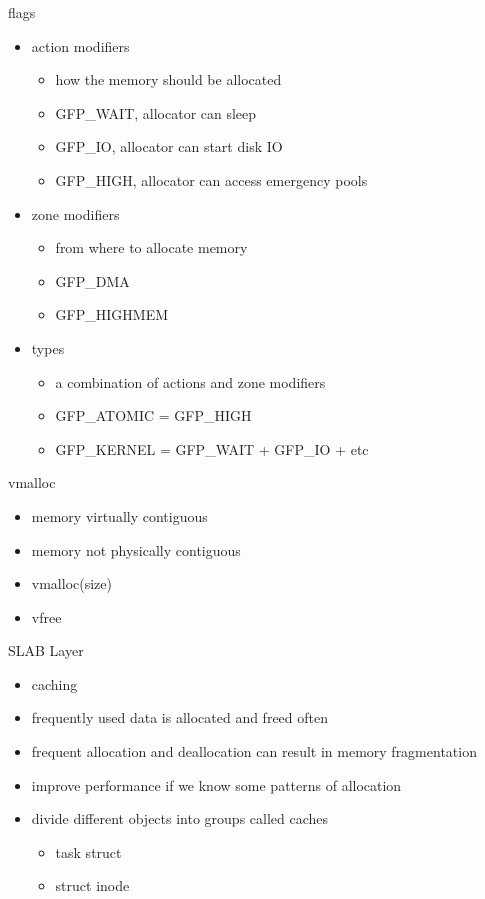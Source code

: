 \documentclass{workshop}
\begin{document}
\begin{frame}{flags}
\begin{itemize}
\item action modifiers
\begin{itemize}
\item how the memory should be allocated
\item GFP_WAIT, allocator can sleep
\item GFP_IO, allocator can start disk IO
\item GFP_HIGH, allocator can access emergency pools
\end{itemize}
\item zone modifiers
\begin{itemize}
\item from where to allocate memory
\item GFP_DMA
\item GFP_HIGHMEM
\end{itemize}
\item types
\begin{itemize}
\item a combination of actions and zone modifiers 
\item GFP_ATOMIC = GFP_HIGH
\item GFP_KERNEL = GFP_WAIT + GFP_IO + etc
\end{itemize}
\end{itemize}
\end{frame}
\begin{frame}{vmalloc}
  \begin{itemize}
  \item memory virtually contiguous
  \item memory not physically contiguous
   \item vmalloc(size)
  \item vfree
  \end{itemize}
\end{frame}

\begin{frame}{SLAB Layer}
  \begin{itemize}
    \item caching
    \item frequently used data is allocated and freed often
    \item frequent allocation and deallocation can result in memory fragmentation
    \item improve performance if we know some patterns of allocation
    \item divide different objects into groups called caches
     \begin{itemize}
	\item task struct
	\item struct inode
     \end{itemize}
  \end{itemize}
\end{frame}
\end{document}

